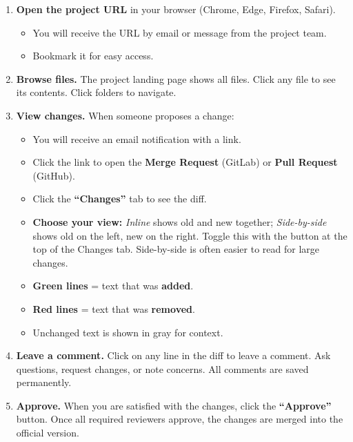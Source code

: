 \documentclass[11pt, letterpaper]{article}
\begin{document}
\begin{enumerate}[leftmargin=*, itemsep=2pt]
    \item \textbf{Open the project URL} in your browser (Chrome, Edge, Firefox, Safari).
    \begin{itemize}[leftmargin=*, itemsep=0pt]
        \item You will receive the URL by email or message from the project team.
        \item Bookmark it for easy access.
    \end{itemize}

    \item \textbf{Browse files.} The project landing page shows all files. Click any file to see its contents. Click folders to navigate.

    \item \textbf{View changes.} When someone proposes a change:
    \begin{itemize}[leftmargin=*, itemsep=0pt]
        \item You will receive an email notification with a link.
        \item Click the link to open the \textbf{Merge Request} (GitLab) or \textbf{Pull Request} (GitHub).
        \item Click the \textbf{``Changes''} tab to see the diff.
        \item \textbf{Choose your view:} \textit{Inline} shows old and new together; \textit{Side-by-side} shows old on the left, new on the right. Toggle this with the button at the top of the Changes tab. Side-by-side is often easier to read for large changes.
        \item \textcolor{green!50!black}{\textbf{Green lines}} = text that was \textbf{added}.
        \item \textcolor{red!70!black}{\textbf{Red lines}} = text that was \textbf{removed}.
        \item Unchanged text is shown in gray for context.
    \end{itemize}

    \item \textbf{Leave a comment.} Click on any line in the diff to leave a comment. Ask questions, request changes, or note concerns. All comments are saved permanently.

    \item \textbf{Approve.} When you are satisfied with the changes, click the \textbf{``Approve''} button. Once all required reviewers approve, the changes are merged into the official version.
\end{enumerate}
\end{document}
